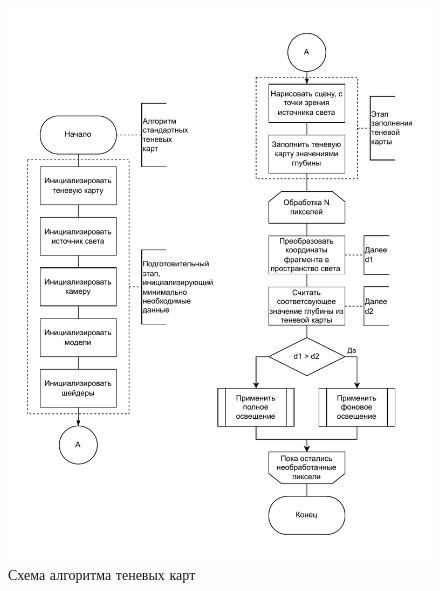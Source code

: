 \begin{figure}[h]
    \centering
    \includegraphics[width=\textwidth]{charts/shadow_map.pdf}
    \caption{Схема алгоритма теневых карт}
    \label{chart:shadow_map}
\end{figure}
\FloatBarrier
